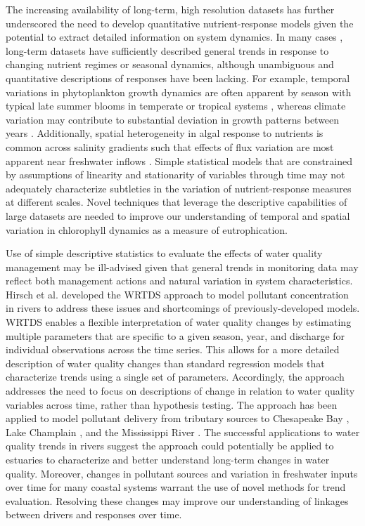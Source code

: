 \documentclass{svjour3}\usepackage[]{graphicx}\usepackage[]{color}
\begin{document}
The increasing availability of long-term, high resolution datasets has further underscored the need to develop quantitative nutrient-response models given the potential to extract detailed information on system dynamics.  In many cases \cite{Caffrey03,Greening06}, long-term datasets have sufficiently described general trends in response to changing nutrient regimes or seasonal dynamics, although unambiguous and quantitative descriptions of responses have been lacking.  For example, temporal variations in phytoplankton growth dynamics are often apparent by season with typical late summer blooms in temperate or tropical systems \cite{Cloern96}, whereas climate variation may contribute to substantial deviation in growth patterns between years \cite{Jassby02}.  Additionally, spatial heterogeneity in algal response to nutrients is common across salinity gradients such that effects of flux variation are most apparent near freshwater inflows \cite{Cloern96}.  Simple statistical models that are constrained by assumptions of linearity and stationarity  of variables through time may not adequately characterize subtleties in the variation of nutrient-response measures at different scales.  Novel techniques that leverage the descriptive capabilities of large datasets are needed to improve our understanding of temporal and spatial variation in chlorophyll dynamics as a measure of eutrophication.

Use of simple descriptive statistics to evaluate the effects of water quality management may be ill-advised given that general trends in monitoring data may reflect both management actions and natural variation in system characteristics.  Hirsch et al. \cite{Hirsch10} developed the \ac{WRTDS} approach to model pollutant concentration in rivers to address these issues and shortcomings of previously-developed models.  \ac{WRTDS} enables a flexible interpretation of water quality changes by estimating multiple parameters that are specific to a given season, year, and discharge for individual observations across the time series.  This allows for a more detailed description of water quality changes than standard regression models that characterize trends using a single set of parameters.  Accordingly, the approach addresses the need to focus on descriptions of change in relation to water quality variables across time, rather than hypothesis testing. The approach has been applied to model pollutant delivery from tributary sources to Chesapeake Bay \cite{Hirsch10,Moyer12,Zhang13}, Lake Champlain \cite{Medalie12}, and the Mississippi River \cite{Sprague11}.  The successful applications to water quality trends in rivers suggest the approach could potentially be applied to estuaries to characterize and better understand long-term changes in water quality.  Moreover, changes in pollutant sources and variation in freshwater inputs over time for many coastal systems warrant the use of novel methods for trend evaluation.  Resolving these changes may improve our understanding of linkages between drivers and responses over time. 
\end{document}
